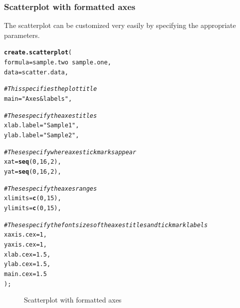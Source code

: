 \documentclass[letterpaper]{article}\usepackage[]{graphicx}\usepackage[]{color}
\makeatletter
\newcommand{\hlnum}[1]{\textcolor[rgb]{0.686,0.059,0.569}{#1}}%
\newcommand{\hlstr}[1]{\textcolor[rgb]{0.192,0.494,0.8}{#1}}%
\newcommand{\hlcom}[1]{\textcolor[rgb]{0.678,0.584,0.686}{\textit{#1}}}%
\newcommand{\hlopt}[1]{\textcolor[rgb]{0,0,0}{#1}}%
\newcommand{\hlstd}[1]{\textcolor[rgb]{0.345,0.345,0.345}{#1}}%
\newcommand{\hlkwc}[1]{\textcolor[rgb]{0.333,0.667,0.333}{#1}}%
\newcommand{\hlkwd}[1]{\textcolor[rgb]{0.737,0.353,0.396}{\textbf{#1}}}%
\newenvironment{kframe}{%
 \def\at@end@of@kframe{}%
 \ifinner\ifhmode%
  \def\at@end@of@kframe{\end{minipage}}%
  \begin{minipage}{\columnwidth}%
 \fi\fi%
 \def\FrameCommand##1{\hskip\@totalleftmargin \hskip-\fboxsep
 \colorbox{shadecolor}{##1}\hskip-\fboxsep
     \hskip-\linewidth \hskip-\@totalleftmargin \hskip\columnwidth}%
 \MakeFramed {\advance\hsize-\width
   \@totalleftmargin\z@ \linewidth\hsize
   \@setminipage}}%
 {\par\unskip\endMakeFramed%
 \at@end@of@kframe}
\newenvironment{knitrout}{}{} %
\makeatother
\begin{document}
\subsubsection{Scatterplot with formatted axes}
The scatterplot can be customized very easily by specifying the appropriate parameters. 
\begin{knitrout}
\color{fgcolor}\begin{kframe}
\begin{alltt}
\hlkwd{create.scatterplot}\hlstd{(}
    \hlkwc{formula} \hlstd{= sample.two} \hlopt{~} \hlstd{sample.one,}
    \hlkwc{data} \hlstd{= scatter.data,}

    \hlcom{# This specifies the plot title}
    \hlkwc{main} \hlstd{=} \hlstr{"Axes & labels"}\hlstd{,}

    \hlcom{# These specify the axes titles}
    \hlkwc{xlab.label} \hlstd{=} \hlstr{"Sample 1"}\hlstd{,}
    \hlkwc{ylab.label} \hlstd{=} \hlstr{"Sample 2"}\hlstd{,}

    \hlcom{# These specify where axes tick marks appear}
    \hlkwc{xat} \hlstd{=} \hlkwd{seq}\hlstd{(}\hlnum{0}\hlstd{,} \hlnum{16}\hlstd{,} \hlnum{2}\hlstd{),}
    \hlkwc{yat} \hlstd{=} \hlkwd{seq}\hlstd{(}\hlnum{0}\hlstd{,} \hlnum{16}\hlstd{,} \hlnum{2}\hlstd{),}

    \hlcom{# These specify the axes ranges}
    \hlkwc{xlimits} \hlstd{=} \hlkwd{c}\hlstd{(}\hlnum{0}\hlstd{,} \hlnum{15}\hlstd{),}
    \hlkwc{ylimits} \hlstd{=} \hlkwd{c}\hlstd{(}\hlnum{0}\hlstd{,} \hlnum{15}\hlstd{),}

    \hlcom{# These specify the font sizes of the axes titles and tick mark labels}
    \hlkwc{xaxis.cex} \hlstd{=} \hlnum{1}\hlstd{,}
    \hlkwc{yaxis.cex} \hlstd{=} \hlnum{1}\hlstd{,}
    \hlkwc{xlab.cex} \hlstd{=} \hlnum{1.5}\hlstd{,}
    \hlkwc{ylab.cex} \hlstd{=} \hlnum{1.5}\hlstd{,}
    \hlkwc{main.cex} \hlstd{=} \hlnum{1.5}
    \hlstd{);}
\end{alltt}
\end{kframe}\begin{figure}[]


{\centering {} 

}

\caption[Scatterplot with formatted axes]{Scatterplot with formatted axes\label{fig:scatter2}}
\end{figure}


\end{knitrout}
\end{document}
